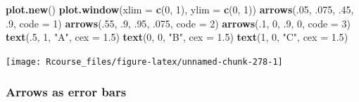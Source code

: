 \documentclass[]{book}
\newenvironment{Shaded}{\begin{snugshade}}{\end{snugshade}}
\newcommand{\KeywordTok}[1]{\textcolor[rgb]{0.13,0.29,0.53}{\textbf{#1}}}
\newcommand{\DataTypeTok}[1]{\textcolor[rgb]{0.13,0.29,0.53}{#1}}
\newcommand{\DecValTok}[1]{\textcolor[rgb]{0.00,0.00,0.81}{#1}}
\newcommand{\FloatTok}[1]{\textcolor[rgb]{0.00,0.00,0.81}{#1}}
\newcommand{\StringTok}[1]{\textcolor[rgb]{0.31,0.60,0.02}{#1}}
\newcommand{\NormalTok}[1]{#1}
\theoremstyle{definition}
\theoremstyle{definition}
\theoremstyle{definition}
\theoremstyle{remark}
\begin{document}
\begin{Shaded}
\begin{Highlighting}[]
\KeywordTok{plot.new}\NormalTok{()}
\KeywordTok{plot.window}\NormalTok{(}\DataTypeTok{xlim =} \KeywordTok{c}\NormalTok{(}\DecValTok{0}\NormalTok{, }\DecValTok{1}\NormalTok{), }\DataTypeTok{ylim =} \KeywordTok{c}\NormalTok{(}\DecValTok{0}\NormalTok{, }\DecValTok{1}\NormalTok{))}
\KeywordTok{arrows}\NormalTok{(.}\DecValTok{05}\NormalTok{, .}\DecValTok{075}\NormalTok{, .}\DecValTok{45}\NormalTok{, .}\DecValTok{9}\NormalTok{, }\DataTypeTok{code =} \DecValTok{1}\NormalTok{)}
\KeywordTok{arrows}\NormalTok{(.}\DecValTok{55}\NormalTok{, .}\DecValTok{9}\NormalTok{, .}\DecValTok{95}\NormalTok{, .}\DecValTok{075}\NormalTok{, }\DataTypeTok{code =} \DecValTok{2}\NormalTok{)}
\KeywordTok{arrows}\NormalTok{(.}\DecValTok{1}\NormalTok{, }\DecValTok{0}\NormalTok{, .}\DecValTok{9}\NormalTok{, }\DecValTok{0}\NormalTok{, }\DataTypeTok{code =} \DecValTok{3}\NormalTok{)}
\KeywordTok{text}\NormalTok{(.}\DecValTok{5}\NormalTok{, }\DecValTok{1}\NormalTok{, }\StringTok{"A"}\NormalTok{, }\DataTypeTok{cex =} \FloatTok{1.5}\NormalTok{)}
\KeywordTok{text}\NormalTok{(}\DecValTok{0}\NormalTok{, }\DecValTok{0}\NormalTok{, }\StringTok{"B"}\NormalTok{, }\DataTypeTok{cex =} \FloatTok{1.5}\NormalTok{)}
\KeywordTok{text}\NormalTok{(}\DecValTok{1}\NormalTok{, }\DecValTok{0}\NormalTok{, }\StringTok{"C"}\NormalTok{, }\DataTypeTok{cex =} \FloatTok{1.5}\NormalTok{)}
\end{Highlighting}
\end{Shaded}

\texttt{[image: Rcourse\_files/figure-latex/unnamed-chunk-278-1]}

\subsubsection{Arrows as error bars}\label{arrows-as-error-bars}
\end{document}
